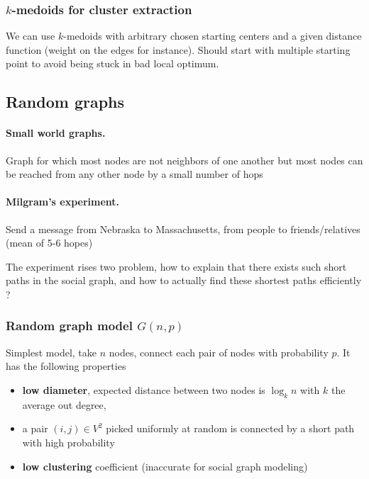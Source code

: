 \subsubsection{$k$-medoids for cluster extraction}

We can use $k$-medoids with arbitrary chosen starting centers and a given distance function (weight on the edges for instance). Should start with multiple starting point to avoid being stuck in bad local optimum.

\subsection{Random graphs}

\paragraph{Small world graphs.}
  Graph for which most nodes are not neighbors of one another but most nodes can be reached from any other node by a small number of hops


\paragraph{Milgram's experiment.} Send a message from Nebraska to Massachusetts, from people to friends/relatives (mean of 5-6 hopes)

The experiment rises two problem, how to explain that there exists such short paths in  the social graph, and how to actually find these shortest paths efficiently ?

\subsubsection{Random graph model $G(n,p)$}

Simplest model, take $n$ nodes, connect each pair of nodes with probability $p$. It has the following properties

\begin{itemize}
  \item \textbf{low diameter}, expected distance between two nodes is $\log_k n$ with $k$ the average out degree,
  \item a pair $(i,j) \in V^2$ picked uniformly at random is connected by a short path with high probability
  \item \textbf{low clustering} coefficient (inaccurate for social graph modeling)
\end{itemize}


